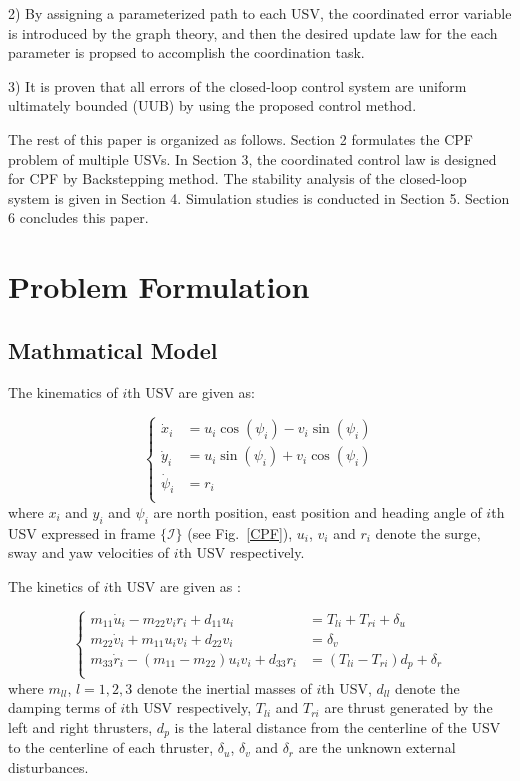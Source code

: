 \documentclass[english]{cccconf}
\begin{document}
2) By assigning a parameterized path to each USV, the coordinated error variable is introduced by the graph theory, and then the desired update law for the each parameter is propsed to accomplish the coordination task.

3) It is proven that all errors of the closed-loop control system are uniform ultimately bounded (UUB) by using the proposed control method.

The rest of this paper is organized as follows. Section 2 formulates the CPF problem of multiple USVs. In Section 3, the coordinated control law is designed for CPF by Backstepping method. The stability analysis of the closed-loop system is given in Section 4. Simulation studies is conducted in Section 5. Section 6 concludes this paper.

\section{Problem Formulation}
\subsection{Mathmatical Model}
The kinematics of $i$th USV are given as:

\begin{equation}\label{kinematics}
	\left\{
	\begin{aligned}
		\dot{x}_i&=u_i\cos(\psi_i)-v_i\sin(\psi_i)\\
		\dot{y}_i&=u_i\sin(\psi_i)+v_i\cos(\psi_i)\\
		\dot{\psi}_i&=r_i\\
	\end{aligned}
	\right.
\end{equation}
where $x_i$ and $y_i$ and $\psi_i$ are north position, east position and heading angle of $i$th USV expressed in frame $\{\mathcal{I}\}$ (see Fig.~\ref{CPF}), $u_i$, $v_i$ and $r_i$ denote the surge, sway and yaw velocities of $i$th USV respectively.

The kinetics of $i$th USV are given as \cite{bib13}:

\begin{equation}\label{kinetics}
	\left\{
	\begin{aligned}
		m_{11}\dot{u}_{i}-m_{22}v_{i}r_{i}+d_{11}u_{i}&=T_{li}+T_{ri}+\delta_{u}\\
		m_{22}\dot{v}_i+m_{11}u_iv_i+d_{22}v_{i}&=\delta_{v}\\
		m_{33}\dot{r}_i-(m_{11}-m_{22})u_iv_i+d_{33}r_i&=(T_{li}-T_{ri})d_p+\delta_r\\
	\end{aligned}
	\right.
\end{equation}
where $m_{ll}$, $l=1,2,3$ denote the inertial masses of $i$th USV, $d_{ll}$ denote the damping terms of $i$th USV respectively, $T_{li}$ and $T_{ri}$ are thrust generated by the left and right thrusters, $d_p$ is the lateral distance from the centerline of the USV to the centerline of each thruster, $\delta_u$, $\delta_v$ and $\delta_r$ are the unknown external disturbances.
\end{document}
